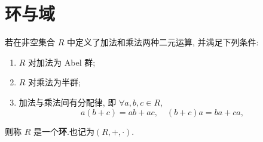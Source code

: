\documentclass[../../main.tex]{subfiles}%
\begin{document}
\section{环与域}

\begin{definition}[环]
若在非空集合 \( R \) 中定义了加法和乘法两种二元运算, 并满足下列条件:
\begin{enumerate}[(1)]
\item \( R \) 对加法为 Abel 群;
\item \( R \) 对乘法为半群;
\item 加法与乘法间有分配律, 即 \( \forall a,b,c \in R \),
\[
a(b + c) = ab + ac, \quad (b + c)a = ba + ca,
\]
\end{enumerate}
则称 \( R \) 是一个\textbf{环}.也记为$(R,+,\cdot).$
\end{definition}
\end{document}
